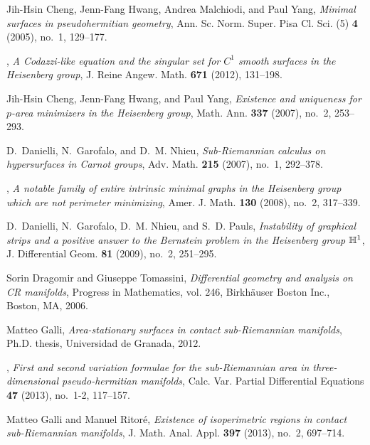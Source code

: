 \documentclass[10pt]{amsart}
\theoremstyle{definition}
\theoremstyle{remark}
\numberwithin{equation}{section}
\begin{document}
\begin{thebibliography}{10}
Jih-Hsin Cheng, Jenn-Fang Hwang, Andrea Malchiodi, and Paul Yang, \emph{Minimal
  surfaces in pseudohermitian geometry}, Ann. Sc. Norm. Super. Pisa Cl. Sci.
  (5) \textbf{4} (2005), no.~1, 129--177. 

\bysame, \emph{A {C}odazzi-like equation and the singular set for {$C^1$}
  smooth surfaces in the {H}eisenberg group}, J. Reine Angew. Math.
  \textbf{671} (2012), 131--198. 

Jih-Hsin Cheng, Jenn-Fang Hwang, and Paul Yang, \emph{Existence and uniqueness
  for {$p$}-area minimizers in the {H}eisenberg group}, Math. Ann. \textbf{337}
  (2007), no.~2, 253--293. 

D.~Danielli, N.~Garofalo, and D.~M. Nhieu, \emph{Sub-{R}iemannian calculus on
  hypersurfaces in {C}arnot groups}, Adv. Math. \textbf{215} (2007), no.~1,
  292--378. 

\bysame, \emph{A notable family of entire intrinsic minimal graphs in the
  {H}eisenberg group which are not perimeter minimizing}, Amer. J. Math.
  \textbf{130} (2008), no.~2, 317--339. 

D.~Danielli, N.~Garofalo, D.~M. Nhieu, and S.~D. Pauls, \emph{Instability of
  graphical strips and a positive answer to the {B}ernstein problem in the
  {H}eisenberg group {$\Bbb H^1$}}, J. Differential Geom. \textbf{81} (2009),
  no.~2, 251--295. 

Sorin Dragomir and Giuseppe Tomassini, \emph{Differential geometry and analysis
  on {CR} manifolds}, Progress in Mathematics, vol. 246, Birkh\"auser Boston
  Inc., Boston, MA, 2006. 

Matteo Galli, \emph{Area-stationary surfaces in contact sub-{R}iemannian
  manifolds}, Ph.D. thesis, Universidad de Granada, 2012.

\bysame, \emph{First and second variation formulae for the sub-{R}iemannian
  area in three-dimensional pseudo-hermitian manifolds}, Calc. Var. Partial
  Differential Equations \textbf{47} (2013), no.~1-2, 117--157. 

Matteo Galli and Manuel Ritor{\'e}, \emph{Existence of isoperimetric regions in
  contact sub-{R}iemannian manifolds}, J. Math. Anal. Appl. \textbf{397}
  (2013), no.~2, 697--714. 


\end{thebibliography}
\end{document}
